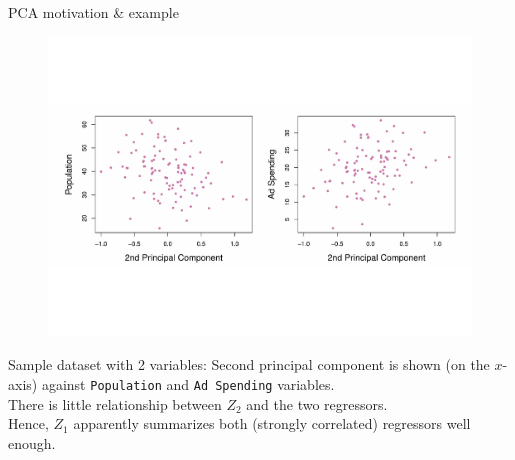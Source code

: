 \documentclass{beamer}
\begin{document}
\begin{frame}{PCA motivation \& example}
\vspace{-2.2cm}
\begin{figure}
\includegraphics[scale=0.40]{IMG/PCAExample4.pdf}
\end{figure}
\vspace{-2cm}
\centering Sample dataset with 2 variables: Second principal component is shown (on the $x$-axis) against \texttt{Population} and \texttt{Ad Spending} variables. \\There is little relationship between $Z_2$ and the two regressors. \\Hence, $Z_1$ apparently summarizes both (strongly correlated) regressors well enough. 
\end{frame}
\end{document}
